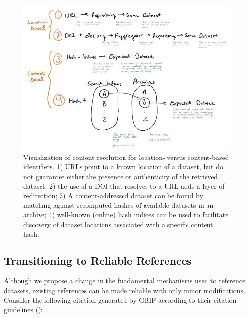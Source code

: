 \documentclass[10pt,letterpaper]{article}
\begin{document}
\begin{figure}[ht] %


\includegraphics[width=\textwidth]{fig4.png}

\caption{Visualization of content resolution for location- versus content-based identifiers. 1) URLs point to a known location of a dataset, but do not guarantee either the presence or authenticity of the retrieved dataset; 2) the use of a DOI that resolves to a URL adds a layer of redirection; 3) A content-addressed dataset can be found by matching against recomputed hashes of available datasets in an archive; 4) well-known (online) hash indices can be used to facilitate discovery of dataset locations associated with a specific content hash.
}

\label{fig4} %

\end{figure}



\subsection*{Transitioning to Reliable References}

Although we propose a change in the fundamental mechanisms used to reference datasets, existing references can be made reliable with only minor modifications. Consider the following citation generated by GBIF according to their citation guidelines (\cite{gbif_2019}):
\end{document}

